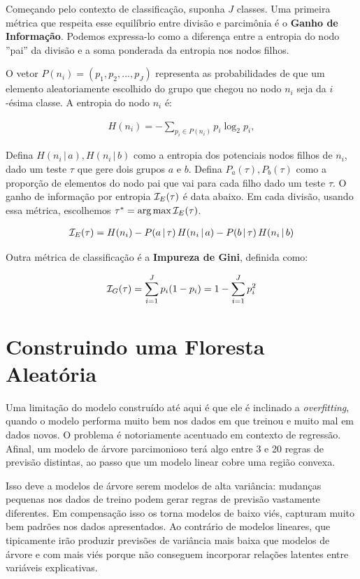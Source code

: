 Começando pelo contexto de classificação, suponha $J$ classes. Uma primeira métrica que respeita esse equilíbrio entre divisão e parcimônia é o \textbf{Ganho de Informação}. Podemos expressa-lo como a diferença entre a entropia do nodo ''pai'' da divisão e a soma ponderada da entropia nos nodos filhos. 

O vetor $P(n_i) = (p_1, p_2, ..., p_J)$ representa as probabilidades de que um elemento aleatoriamente escolhido do grupo que chegou no nodo $n_i$ seja da $i$-ésima classe. A entropia do nodo $n_i$ é:

\begin{align}
    H(n_i) = - \sum_{p_i \in P(n_i)} p_i \log_2 p_i, 
\end{align}

Defina $H(n_i \, | \, a), H(n_i \, |\,  b)$ como a entropia dos potenciais nodos filhos de $n_i$, dado um teste $\tau$ que gere dois grupos $a$ e $b$. Defina $P_a(\tau), P_b(\tau)$ como a proporção de elementos do nodo pai que vai para cada filho dado um teste $\tau$. O ganho de informação por entropia $\mathcal{I}_E(\tau)$ é data abaixo. Em cada divisão, usando essa métrica, escolhemos $\tau^* = \operatorname*{arg\,max}{\mathcal{I}_E(\tau)}$.

\begin{align}
    \mathcal{I}_E(\tau) = H(n_i) - P(a\, |\, \tau) \,H(n_i \, |\,  a) - P(b \,| \,\tau)\, H(n_i \, |\,  b)
\end{align}

 Outra métrica de classificação é a \textbf{Impureza de Gini}, definida como:
 
 \begin{align}
     \mathcal{I}_G(\tau) = \sum_{i = 1}^J p_i ( 1  - p_i) =  1 - \sum_{i = 1}^J p_i^2
 \end{align}



 \section{Construindo uma Floresta Aleatória}
 

Uma limitação do modelo construído até aqui é que ele é inclinado a \textit{overfitting}, quando o modelo performa muito bem nos dados em que treinou e muito mal em dados novos. O problema é notoriamente acentuado em contexto de regressão. Afinal, um modelo de árvore parcimonioso terá algo entre 3 e 20 regras de previsão distintas, ao passo que um modelo linear cobre uma região convexa. 

Isso deve a modelos de árvore serem modelos de alta variância: mudanças pequenas nos dados de treino podem gerar regras de previsão vastamente diferentes. Em compensação isso os torna modelos de baixo viés, capturam muito bem padrões nos dados apresentados. Ao contrário de modelos lineares, que tipicamente irão produzir previsões de variância mais baixa que modelos de árvore e com mais viés porque não conseguem incorporar relações latentes entre variáveis explicativas. 

